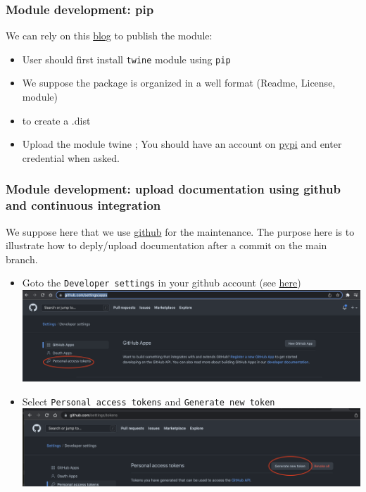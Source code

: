 \documentclass[8pt]{beamer}
\begin{document}
\begin{frame}
  \frametitle{Module development: pip}
    We can rely on this \href{https://www.geeksforgeeks.org/how-to-publish-python-package-at-pypi-using-twine-module}{blog} to publish the module:
    \begin{itemize}
    \item User should first install \texttt{twine} module using \texttt{pip}
    \item We suppose the package is organized in a well format (Readme, License, module)
     \item {} to create a .dist
     \item Upload the module twine ; You should have an account on \href{pypi.org}{pypi} and enter credential when asked.
    \end{itemize}
\end{frame}

\begin{frame}
  \frametitle{Module development: upload documentation using github and continuous integration}
    We suppose here that we use \href{https://github.com}{github} for the maintenance. The purpose here is to illustrate how to deply\slash upload documentation after a commit on the main branch.
    \begin{itemize}
      \item Goto the \texttt{Developer settings} in your github account (see \href{https://github.com/settings/apps}{here})
      \includegraphics[width=10.cm]{github_settings.png}
      \item Select \texttt{Personal access tokens} and \texttt{Generate new token} \\
     \includegraphics[width=8.cm]{generate_token.png}
    \end{itemize}
\end{frame}
\end{document}

